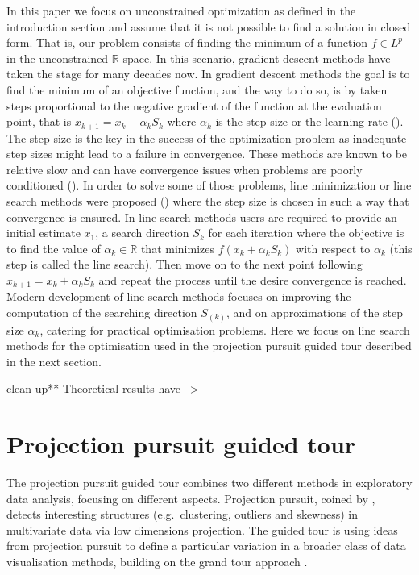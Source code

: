 \documentclass[12pt]{article}
\begin{document}
In this paper we focus on unconstrained optimization as defined in the introduction section and assume that it is not possible to find a solution in closed form. That is, our problem consists of finding the minimum of a function \(f \in L^p\) in the unconstrained \(\mathbb{R}\) space. In this scenario, gradient descent methods have taken the stage for many decades now. In gradient descent methods the goal is to find the minimum of an objective function, and the way to do so, is by taken steps proportional to the negative gradient of the function at the evaluation point, that is \(x_{k+1} = x_k -\alpha_kS_k\) where \(\alpha_k\) is the step size or the learning rate (\citet{fletcher2013practical}). The step size is the key in the success of the optimization problem as inadequate step sizes might lead to a failure in convergence. These methods are known to be relative slow and can have convergence issues when problems are poorly conditioned (\citet{trefethen1997numerical}). In order to solve some of those problems, line minimization or line search methods were proposed (\citet{shi2004convergence}) where the step size is chosen in such a way that convergence is ensured. In line search methods users are required to provide an initial estimate \(x_{1}\), a search direction \(S_k\) for each iteration where the objective is to find the value of \(\alpha_k \in \mathbb{R}\) that minimizes \(f(x_k + \alpha_kS_k)\) with respect to \(\alpha_k\) (this step is called the line search). Then move on to the next point following \(x_{k+1} = x_k + \alpha_kS_k\) and repeat the process until the desire convergence is reached.
Modern development of line search methods focuses on improving the computation of the searching direction \(S_{(k)}\), and on approximations of the step size \(\alpha_k\), catering for practical optimisation problems. Here we focus on line search methods for the optimisation used in the projection pursuit guided tour described in the next section.

clean up** Theoretical results have --\textgreater{}

\hypertarget{tour}{%
\section{Projection pursuit guided tour}\label{tour}}

The projection pursuit guided tour combines two different methods in exploratory data analysis, focusing on different aspects. Projection pursuit, coined by \citet{friedman1974projection}, detects interesting structures (e.g.~clustering, outliers and skewness) in multivariate data via low dimensions projection. The guided tour is using ideas from projection pursuit to define a particular variation in a broader class of data visualisation methods, building on the grand tour approach \citep{As85}.
\end{document}
